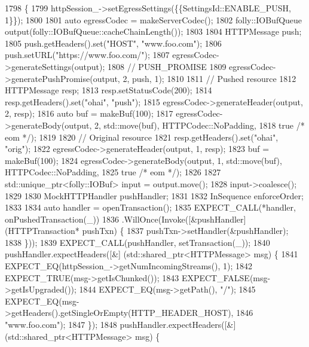 \begin{DoxyCode}
1798                                              \{
1799   httpSession\_->setEgressSettings(\{\{SettingsId::ENABLE\_PUSH, 1\}\});
1800 
1801   \textcolor{keyword}{auto} egressCodec = makeServerCodec();
1802   folly::IOBufQueue output(folly::IOBufQueue::cacheChainLength());
1803 
1804   HTTPMessage push;
1805   push.getHeaders().set(\textcolor{stringliteral}{"HOST"}, \textcolor{stringliteral}{"www.foo.com"});
1806   push.setURL(\textcolor{stringliteral}{"https://www.foo.com/"});
1807   egressCodec->generateSettings(output);
1808   \textcolor{comment}{// PUSH\_PROMISE}
1809   egressCodec->generatePushPromise(output, 2, push, 1);
1810 
1811   \textcolor{comment}{// Pushed resource}
1812   HTTPMessage resp;
1813   resp.setStatusCode(200);
1814   resp.getHeaders().set(\textcolor{stringliteral}{"ohai"}, \textcolor{stringliteral}{"push"});
1815   egressCodec->generateHeader(output, 2, resp);
1816   \textcolor{keyword}{auto} buf = makeBuf(100);
1817   egressCodec->generateBody(output, 2, std::move(buf), HTTPCodec::NoPadding,
1818                             \textcolor{keyword}{true} \textcolor{comment}{/* eom */});
1819 
1820   \textcolor{comment}{// Original resource}
1821   resp.getHeaders().set(\textcolor{stringliteral}{"ohai"}, \textcolor{stringliteral}{"orig"});
1822   egressCodec->generateHeader(output, 1, resp);
1823   buf = makeBuf(100);
1824   egressCodec->generateBody(output, 1, std::move(buf), HTTPCodec::NoPadding,
1825                            \textcolor{keyword}{true} \textcolor{comment}{/* eom */});
1826 
1827   std::unique\_ptr<folly::IOBuf> input = output.move();
1828   input->coalesce();
1829 
1830   MockHTTPHandler pushHandler;
1831 
1832   InSequence enforceOrder;
1833 
1834   \textcolor{keyword}{auto} handler = openTransaction();
1835   EXPECT\_CALL(*handler, onPushedTransaction(\_))
1836     .WillOnce(Invoke([&pushHandler] (HTTPTransaction* pushTxn) \{
1837           pushTxn->setHandler(&pushHandler);
1838         \}));
1839   EXPECT\_CALL(pushHandler, setTransaction(\_));
1840   pushHandler.expectHeaders([&] (std::shared\_ptr<HTTPMessage> msg) \{
1841       EXPECT\_EQ(httpSession\_->getNumIncomingStreams(), 1);
1842       EXPECT\_TRUE(msg->getIsChunked());
1843       EXPECT\_FALSE(msg->getIsUpgraded());
1844       EXPECT\_EQ(msg->getPath(), \textcolor{stringliteral}{"/"});
1845       EXPECT\_EQ(msg->getHeaders().getSingleOrEmpty(HTTP\_HEADER\_HOST),
1846                 \textcolor{stringliteral}{"www.foo.com"});
1847     \});
1848   pushHandler.expectHeaders([&] (std::shared\_ptr<HTTPMessage> msg) \{

\end{DoxyCode}

